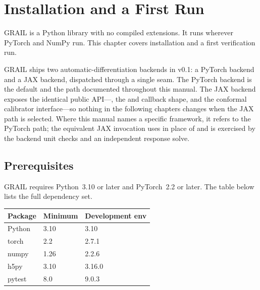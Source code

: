 %
%
%

\chapter{Installation and a First Run}
\label{ch:install}

GRAIL is a Python library with no compiled extensions.
It runs wherever PyTorch and NumPy run.
This chapter covers installation and a first verification run.

GRAIL ships two automatic-differentiation backends in v0.1: a PyTorch backend
and a JAX backend, dispatched through a single 
seam.
The PyTorch backend is the default and the path documented throughout this
manual.
The JAX backend exposes the identical public API---,
the  and  callback shape, and the conformal
calibrator interface---so nothing in the following chapters changes when
the JAX path is selected.
Where this manual names a specific framework, it refers to the PyTorch path;
the equivalent JAX invocation uses  in place of 
and is exercised by the backend unit checks and an independent response solve.

\section{Prerequisites}
\label{sec:prereqs}

GRAIL requires Python~3.10 or later and PyTorch~2.2 or later.
The table below lists the full dependency set.

\begin{center}
\small
\begin{tabular}{l l l}
\toprule
Package & Minimum & Development env \\
\midrule
Python  & 3.10   & 3.10   \\
torch   & 2.2    & 2.7.1  \\
numpy   & 1.26   & 2.2.6  \\
h5py    & 3.10   & 3.16.0 \\
pytest  & 8.0    & 9.0.3  \\
\bottomrule
\end{tabular}
\end{center}

